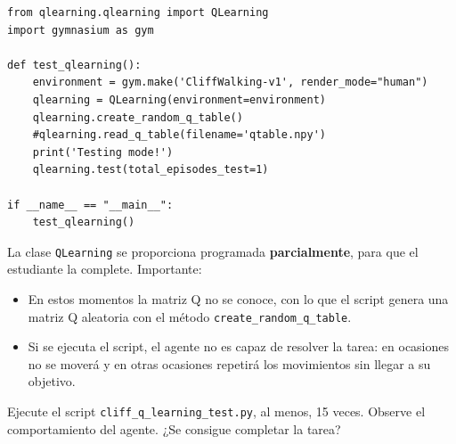 \documentclass{article}
\begin{document}
\begin{verbatim}
from qlearning.qlearning import QLearning
import gymnasium as gym

def test_qlearning():
    environment = gym.make('CliffWalking-v1', render_mode="human")
    qlearning = QLearning(environment=environment)
    qlearning.create_random_q_table() 
    #qlearning.read_q_table(filename='qtable.npy')
    print('Testing mode!')
    qlearning.test(total_episodes_test=1)

if __name__ == "__main__":
    test_qlearning()
\end{verbatim}












La clase \texttt{QLearning} se proporciona programada \textbf{parcialmente}, para que el estudiante la complete. Importante:
\begin{itemize}
    \item En estos momentos la matriz Q no se conoce, con lo que el script genera una matriz Q aleatoria con el método \texttt{create\_random\_q\_table}.
    \item Si se ejecuta el script, el agente no es capaz de resolver la tarea: en ocasiones no se moverá y en otras ocasiones repetirá los movimientos sin llegar a su objetivo.
\end{itemize}


\begin{exercise}
    Ejecute el script \texttt{cliff\_q\_learning\_test.py}, al menos, 15 veces. Observe el comportamiento del agente. ¿Se consigue completar la tarea?
\end{exercise}






\end{document}

